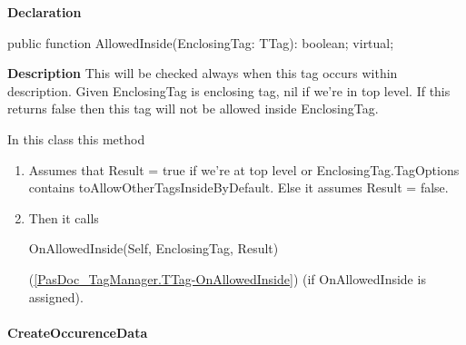 \documentclass{report}
\newif\ifpdf
\begin{document}
\label{PasDoc_TagManager.TTag-AllowedInside}
\begin{list}{}{
\setlength{\itemindent}{0cm}
\setlength{\listparindent}{0cm}
\setlength{\leftmargin}{\evensidemargin}
\addtolength{\leftmargin}{\tmplength}
\settowidth{\labelsep}{X}
\addtolength{\leftmargin}{\labelsep}
\setlength{\labelwidth}{\tmplength}
}
\item[\textbf{Declaration}\hfill]
\ifpdf
\begin{flushleft}
\fi
\begin{ttfamily}
public function AllowedInside(EnclosingTag: TTag): boolean; virtual;\end{ttfamily}

\ifpdf
\end{flushleft}
\fi

\par
\item[\textbf{Description}]
This will be checked always when this tag occurs within description. Given EnclosingTag is enclosing tag, nil if we're in top level. If this returns false then this tag will not be allowed inside EnclosingTag.

In this class this method \begin{enumerate}
\setcounter{enumi}{0} \setcounter{enumii}{0} \setcounter{enumiii}{0} \setcounter{enumiv}{0} 
\item  Assumes that Result = true if we're at top level or EnclosingTag.TagOptions contains toAllowOtherTagsInsideByDefault. Else it assumes Result = false.
\setcounter{enumi}{1} \setcounter{enumii}{1} \setcounter{enumiii}{1} \setcounter{enumiv}{1} 
\item  Then it calls \begin{ttfamily}OnAllowedInside(Self, EnclosingTag, Result)\end{ttfamily}(\ref{PasDoc_TagManager.TTag-OnAllowedInside}) (if OnAllowedInside is assigned).
\end{enumerate}

\end{list}
\paragraph*{CreateOccurenceData}\hspace*{\fill}
\end{document}
